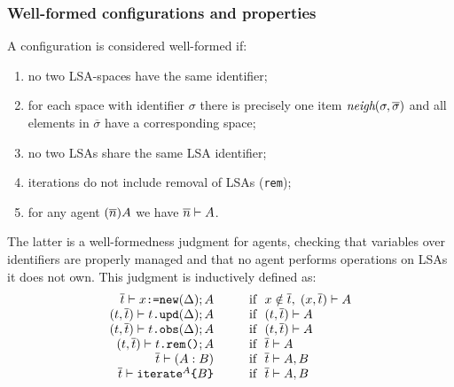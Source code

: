 \documentclass[12pt,a4paper,twoside,openright]{book}
\begin{document}
\subsubsection{Well-formed configurations and properties}

A configuration is considered well-formed if:
\begin{enumerate}
 \item no two LSA-spaces have the same identifier;
 \item for each space with identifier $\sigma$ there is precisely one item $\textit{neigh}(\sigma,\overline{\sigma})$ and all elements in $\overline{\sigma}$ have a corresponding space;
 \item no two LSAs share the same LSA identifier;
 \item iterations do not include removal of LSAs (\texttt{rem});
 \item for any agent $(\overline{n})A$ we have $\overline{n}\vdash A$.
\end{enumerate}
%
The latter is a well-formedness judgment for agents, checking that variables over identifiers are properly managed and that no agent performs operations on LSAs it does not own. This judgment is inductively defined as:
%
\[\begin{array}{r@{\hspace{1cm}}l}
%
\ccheck{\cList{\sTr}}{\cNew{\sVr}{\sDE}\oSeq\sAg} & \textrm{if~~} x\notin\cList{\sTr} \myquad \ccheck{(\sVr,\cList{\sTr})}{\sAg}\\
\ccheck{(\sTr,\cList{\sTr})}{\cUpd{\sTr}{\sDE}\oSeq\sAg} & \textrm{if~~} \ccheck{(\sTr,\cList{\sTr})}{\sAg}\\
\ccheck{(\sTr,\cList{\sTr})}{\cObs{\sTr}{\sDE}\oSeq\sAg} & \textrm{if~~} \ccheck{(\sTr,\cList{\sTr})}{\sAg}\\
\ccheck{(\sTr,\cList{\sTr})}{\cRem{\sTr}\oSeq\sAg} & \textrm{if~~} \ccheck{\cList{\sTr}}{\sAg}\\
\ccheck{\cList{\sTr}}{(\sAg\oOr\sAgB)} & \textrm{if~~} \ccheck{\cList{\sTr}}{\sAg,\sAgB}\\
\ccheck{\cList{\sTr}}{\cRecR{\sAgB}{\sAg}} & \textrm{if~~} \ccheck{\cList{\sTr}}{\sAg,\sAgB}\\
%
\end{array}\]
%
\end{document}
